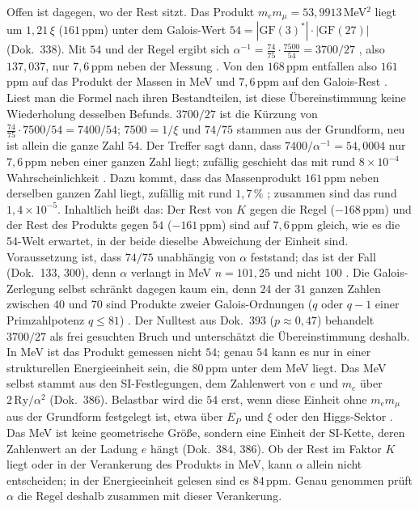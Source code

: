 Offen ist dagegen, wo der Rest sitzt. Das Produkt $m_em_\mu=53{,}9913$\,MeV$^2$ liegt um $1{,}21\,\xi$
($161$\,ppm) unter dem Galois-Wert $54=|\mathrm{GF}(3)^*|\cdot|\mathrm{GF}(27)|$ (Dok.~338). Mit $54$
und der Regel ergibt sich $\alpha^{-1}=\tfrac{74}{75}\cdot\tfrac{7500}{54}=3700/27$ \BM, also
$137{,}037$, nur $7{,}6$\,ppm neben der Messung \KM. Von den $168$\,ppm entfallen also $161$\,ppm auf das Produkt der
Massen in MeV und $7{,}6$\,ppm auf den Galois-Rest \KM. Liest man die Formel nach ihren Bestandteilen, ist diese
Übereinstimmung keine Wiederholung desselben Befunds. $3700/27$ ist die Kürzung von
$\tfrac{74}{75}\cdot7500/54=7400/54$; $7500=1/\xi$ und $74/75$ stammen aus der Grundform, neu ist
allein die ganze Zahl $54$. Der Treffer sagt dann, dass $7400/\alpha^{-1}=54{,}0004$ nur $7{,}6$\,ppm
neben einer ganzen Zahl liegt; zufällig geschieht das mit rund $8\times10^{-4}$ Wahrscheinlichkeit
\KM. Dazu kommt, dass das Massenprodukt $161$\,ppm neben derselben ganzen Zahl liegt, zufällig mit
rund $1{,}7\,\%$ \KM; zusammen sind das rund $1{,}4\times10^{-5}$. Inhaltlich heißt das: Der Rest von
$K$ gegen die Regel ($-168$\,ppm) und der Rest des Produkts gegen $54$ ($-161$\,ppm) sind auf
$7{,}6$\,ppm gleich, wie es die 54-Welt erwartet, in der beide dieselbe Abweichung der Einheit sind.
Voraussetzung ist, dass $74/75$ unabhängig von $\alpha$ feststand; das ist der Fall (Dok.~133, 300),
denn $\alpha$ verlangt in MeV $n=101{,}25$ und nicht $100$ \SM. Die Galois-Zerlegung selbst schränkt
dagegen kaum ein, denn $24$ der $31$ ganzen Zahlen zwischen $40$ und $70$ sind Produkte zweier
Galois-Ordnungen ($q$ oder $q-1$ einer Primzahlpotenz $q\le81$) \KM. Der Nulltest aus Dok.~393
($p\approx0{,}47$) behandelt $3700/27$ als frei gesuchten Bruch und unterschätzt die Übereinstimmung
deshalb. In MeV ist das Produkt gemessen nicht $54$; genau $54$ kann es nur in einer strukturellen
Energieeinheit sein, die $80$\,ppm unter dem MeV liegt. Das MeV selbst stammt aus den
SI-Festlegungen, dem Zahlenwert von $e$ und $m_e$ über $2\,\mathrm{Ry}/\alpha^2$ (Dok.~386).
Belastbar wird die $54$ erst, wenn diese Einheit ohne $m_em_\mu$ aus der Grundform festgelegt ist,
etwa über $E_P$ und $\xi$ oder den Higgs-Sektor \SM. Das MeV ist keine geometrische Größe, sondern
eine Einheit der SI-Kette, deren Zahlenwert an der Ladung $e$ hängt (Dok.~384, 386). Ob der Rest im
Faktor $K$ liegt oder in der Verankerung des Produkts in MeV, kann $\alpha$ allein nicht entscheiden;
in der Energieeinheit gelesen sind es $84$\,ppm. Genau genommen prüft $\alpha$ die Regel deshalb
zusammen mit dieser Verankerung.

